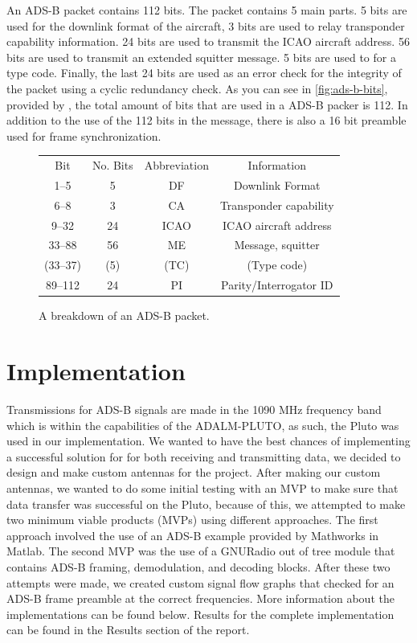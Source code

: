 \documentclass[conference, onecolumn]{IEEEtran}
\begin{document}
An ADS-B packet contains 112 bits. The packet contains 5 main parts. 5 bits are used for the downlink format of the aircraft, 3 bits are used to relay transponder capability information. 24 bits are used to transmit the ICAO aircraft address. 56 bits are used to transmit an extended squitter message. 5 bits are used to for a type code. Finally, the last 24 bits are used as an error check for the integrity of the packet using a cyclic redundancy check. As you can see in \autoref{fig:ads-b-bits}, provided by \cite{sun1090mhz}, the total amount of bits that are used in a ADS-B packer is 112. In addition to the use of the 112 bits in the message, there is also a 16 bit preamble used for frame synchronization.

\begin{figure}
\begin{center}
\begin{tabular}{ | c | c | c | c | }
  Bit & No. Bits & Abbreviation & Information \\ 
  1–5 & 5 & DF & Downlink Format \\
  6–8 & 3 & CA & Transponder capability \\
  9–32 & 24 & ICAO & ICAO aircraft address \\
  33–88 & 56 & ME & Message, squitter \\
  (33–37) & (5) & (TC) & (Type code) \\
  89–112 & 24 & PI & Parity/Interrogator ID
\end{tabular}
\end{center}
\caption{A breakdown of an ADS-B packet.}\label{fig:ads-b-bits}
\end{figure}

\section{Implementation}
Transmissions for ADS-B signals are made in the 1090 MHz frequency band which is within the capabilities of the ADALM-PLUTO, as such, the Pluto was used in our implementation. We wanted to have the best chances of implementing a successful solution for for both receiving and transmitting data, we decided to design and make custom antennas for the project. After making our custom antennas, we wanted to do some initial testing with an MVP to make sure that data transfer was successful on the Pluto, because of this, we attempted to make two minimum viable products (MVPs) using different approaches. The first approach involved the use of an ADS-B example provided by Mathworks in Matlab. The second MVP was the use of a GNURadio out of tree module that contains ADS-B framing, demodulation, and decoding blocks. After these two attempts were made, we created custom signal flow graphs that checked for an ADS-B frame preamble at the correct frequencies. More information about the implementations can be found below. Results for the complete implementation can be found in the Results section of the report.
\end{document}
